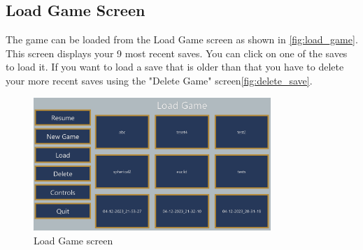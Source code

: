 \subsection{Load Game Screen}
The game can be loaded from the Load Game screen  as shown in \autoref{fig:load_game}.
This screen displays your 9 most recent saves.
You can click on one of the saves to load it.
If you want to load a save that is older than that you have to delete your more recent saves using the "Delete Game" screen\ref*{fig:delete_save}.

\begin{figure}[H]
    \centering
    \includegraphics[width=0.8\textwidth]{sections/user_manual/resources/load-game.png}
    \caption{Load Game screen}
    \label{fig:load_game}
\end{figure}